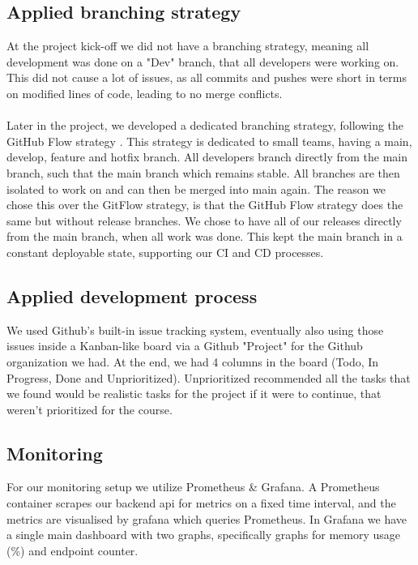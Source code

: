 \subsection{Applied branching strategy}\label{subsec:branching_strategy}
At the project kick-off we did not have a branching strategy, meaning all development was done on a "Dev" branch, that all developers were working on. This did not cause a lot of issues, as all commits and pushes were short in terms on modified lines of code, leading to no merge conflicts.
\\\\
Later in the project, we developed a dedicated branching strategy, following the GitHub Flow strategy \cite{branching_strategy}. This strategy is dedicated to small teams, having a main, develop, feature and hotfix branch. All developers branch directly from the main branch, such that the main branch which remains stable. All branches are then isolated to work on and can then be merged into main again. The reason we chose this over the GitFlow strategy, is that the GitHub Flow strategy does the same but without release branches. We chose to have all of our releases directly from the main branch, when all work was done. This kept the main branch in a constant deployable state, supporting our CI and CD processes.

\subsection{Applied development process}
We used Github's built-in issue tracking system, eventually also using those issues inside a Kanban-like board via a Github "Project" for the Github organization we had. At the end, we had 4 columns in the board (Todo, In Progress, Done and Unprioritized). Unprioritized recommended all the tasks that we found would be realistic tasks for the project if it were to continue, that weren't prioritized for the course. 
\subsection{Monitoring}
For our monitoring setup we utilize Prometheus \& Grafana. A Prometheus container scrapes our backend api for metrics on a fixed time interval, and the metrics are visualised by grafana which queries Prometheus. In Grafana we have a single main dashboard with two graphs, specifically graphs for memory usage (\%) and endpoint counter. \\

